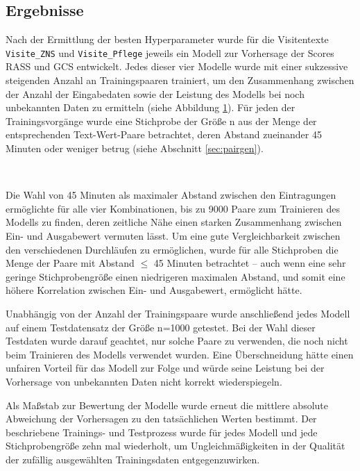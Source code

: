 \subsection{Ergebnisse}
Nach der Ermittlung der besten Hyperparameter wurde für die Visitentexte \texttt{Visite\_ZNS} und \texttt{Visite\_Pflege} jeweils ein Modell zur Vorhersage der Scores RASS und GCS entwickelt. Jedes dieser vier Modelle wurde mit einer sukzessive steigenden Anzahl an Trainingspaaren trainiert, um den Zusammenhang zwischen der Anzahl der Eingabedaten sowie der Leistung des Modells bei noch unbekannten Daten zu ermitteln (siehe Abbildung \ref{fig:svm_perf}). Für jeden der Trainingsvorgänge wurde eine Stichprobe der Größe n aus der Menge der entsprechenden Text-Wert-Paare betrachtet, deren Abstand zueinander 45 Minuten oder weniger betrug (siehe Abschnitt \ref{sec:pairgen}). 

\begin{figure}[htbp]
    \centering
     \\
    \caption{}
    \label{fig:svm_perf}
\end{figure}

Die Wahl von 45 Minuten als maximaler Abstand zwischen den Eintragungen ermöglich\-te für alle vier Kombinationen, bis zu 9000 Paare zum Trainieren des Modells zu finden, deren zeitliche Nähe einen starken Zusammenhang zwischen Ein- und Ausgabewert vermuten lässt. Um eine gute Vergleichbarkeit zwischen den verschiedenen Durchläufen zu ermöglichen, wurde für alle Stichproben die Menge der Paare mit Abstand $\leq$ 45 Minuten betrachtet -- auch wenn eine sehr geringe Stichprobengröße einen niedrigeren maximalen Abstand, und somit eine höhere Korrelation zwischen Ein- und Ausgabewert, ermöglicht hätte.

Unabhängig von der Anzahl der Trainingspaare wurde anschließend jedes Modell auf einem Testdatensatz der Größe n=1000 getestet. Bei der Wahl dieser Testdaten wurde darauf geachtet, nur solche Paare zu verwenden, die noch nicht beim Trainieren des Modells verwendet wurden. Eine Überschneidung hätte einen unfairen Vorteil für das Modell zur Folge und würde seine Leistung bei der Vorhersage von unbekannten Daten nicht korrekt wiederspiegeln.

Als Maßstab zur Bewertung der Modelle wurde erneut die mittlere absolute Abweichung der Vorhersagen zu den tatsächlichen Werten bestimmt. Der beschriebene Trainings- und Testprozess wurde für jedes Modell und jede Stichprobengröße zehn mal wiederholt, um Ungleichmäßigkeiten in der Qualität der zufällig ausgewählten Trainingsdaten entgegenzuwirken.


